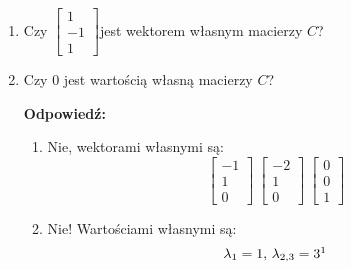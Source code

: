 \begin{enumerate}[label=\alph*)]
\begin{enumerate}[label=\Roman*:]
\end{enumerate}
\item Czy $\begin{bmatrix}
1\\-1\\1
\end{bmatrix}$jest wektorem własnym macierzy $C$?
\item Czy $0$ jest wartością własną macierzy $C$? 

\textbf{Odpowiedź:}
\begin{enumerate}[label=\alph*)]
\item Nie, wektorami własnymi są:
$$\begin{bmatrix}
-1\\1\\0
\end{bmatrix}\ \begin{bmatrix}
-2\\1\\0
\end{bmatrix}\ \begin{bmatrix}
0\\0\\1
\end{bmatrix}$$
\item Nie! Wartościami własnymi są:
$$\lambda _1 = 1,\, \lambda _{2,3}=3\footnotemark$$
\end{enumerate}
\end{enumerate}

